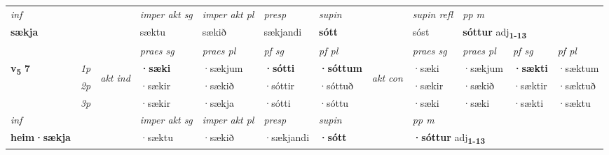 \begin{longtable}[l]{X>{\footnotesize\itshape}llXXXXlXXXX}
   {\textit{inf}} & &  & \textit{imper akt sg} & \textit{imper akt pl}   & \textit{presp} & \textit{supin} && \textit{supin refl} & \textit{pp m} \\*
  {\textbf{sækja}} & && sæktu  & sækið   & sækjandi &  \textbf{sótt} && sóst & \multicolumn{2}{l}{\textbf{sóttur} adj\textbf{\textsubscript{1-13}}} \\*

\midrule

 & &   & \textit{praes sg}  & \textit{praes pl}    & \textit{ pf sg} & \textit{pf pl} & & \textit{praes sg}  & \textit{praes pl}    & \textit{pf sg} & \textit{pf pl }  \\ \cmidrule{4-7} \cmidrule{9-12}
 \multirow{2}{*}{{{\textbf{v{\textsubscript{5}}} \Large{\textbf{7}}}}}  & 1p & \multirow{3}{*}{\begin{turn}{90}\textit{akt ind}\end{turn}} & \textbf{·sæki} & ·sækjum & \textbf{·sótti} & \textbf{·sóttum} & \multirow{3}{*}{\begin{turn}{90}\textit{akt con}\end{turn}} &·sæki & ·sækjum & \textbf{·sækti} & ·sæktum\\*
 & 2p &  &  ·sækir  & ·sækið & ·sóttir & ·sóttuð & & ·sækir & ·sækið & ·sæktir & ·sæktuð \\*
 & 3p &  & ·sækir & ·sækja & ·sótti & ·sóttu & & ·sæki & ·sæki& ·sækti & ·sæktu \\*
\cmidrule{4-7} \cmidrule{9-12}

   {\textit{inf}} & &  & \textit{imper akt sg} & \textit{imper akt pl}   & \textit{presp} & \textit{supin}  && \textit{pp m} \\*
  {\textbf{heim\allowbreak ·sækja}} & && ·sæktu  & ·sækið   & ·sækjandi &  \textbf{·sótt}  && \multicolumn{2}{l}{\textbf{·sóttur} adj\textbf{\textsubscript{1-13}}} \\*

\midrule


\end{longtable}

